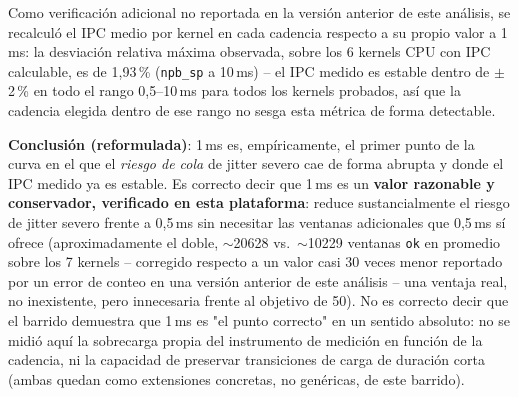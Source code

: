 Como verificación adicional no reportada en la versión anterior de este
análisis, se recalculó el IPC medio por kernel en cada cadencia respecto a
su propio valor a 1\,ms: la desviación relativa máxima observada, sobre
los 6 kernels CPU con IPC calculable, es de 1{,}93\,\% (\texttt{npb\_sp} a
10\,ms) -- el IPC medido es estable dentro de $\pm$ 2\,\% en todo el rango
0{,}5--10\,ms para todos los kernels probados, así que la cadencia elegida
dentro de ese rango no sesga esta métrica de forma detectable.

\textbf{Conclusión (reformulada)}: 1\,ms es, empíricamente, el primer
punto de la curva en el que el \emph{riesgo de cola} de jitter severo cae
de forma abrupta y donde el IPC medido ya es estable. Es correcto decir
que 1\,ms es un \textbf{valor razonable y conservador, verificado en esta
plataforma}: reduce sustancialmente el riesgo de jitter severo frente a
0{,}5\,ms sin necesitar las ventanas adicionales que 0{,}5\,ms sí ofrece
(aproximadamente el doble, $\sim$20628 vs.\ $\sim$10229 ventanas
\texttt{ok} en promedio sobre los 7 kernels -- corregido respecto a un
valor casi 30 veces menor reportado por un error de conteo en una versión
anterior de este análisis -- una ventaja real, no inexistente, pero
innecesaria frente al objetivo de 50). No es correcto decir que el barrido demuestra que 1\,ms es
"el punto correcto" en un sentido absoluto: no se midió aquí la sobrecarga
propia del instrumento de medición en función de la cadencia, ni la
capacidad de preservar transiciones de carga de duración corta (ambas
quedan como extensiones concretas, no genéricas, de este barrido).
